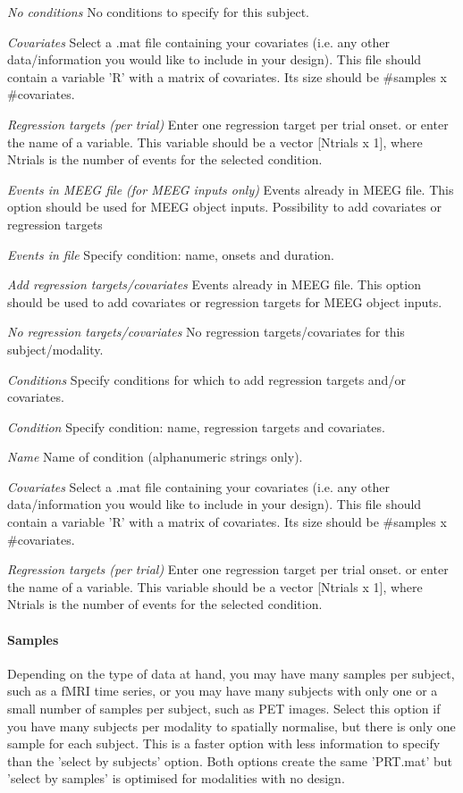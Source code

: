 \textit{No conditions}
No conditions to specify for this subject.


\textit{Covariates}
Select a .mat file containing your covariates (i.e. any other data/information you would like to include in your design). This file should contain a variable 'R' with a matrix of covariates. Its size should be \#samples x \#covariates.


\textit{Regression targets (per trial)}
Enter one regression target per trial onset. or enter the name of a variable.  This variable should be a vector [Ntrials x 1], where Ntrials is the number of events for the selected condition.


\textsl{Events in MEEG file (for MEEG inputs only)}
Events already in MEEG file. This option should be used for MEEG object inputs. Possibility to add covariates or regression targets


\textit{Events in file}
Specify condition: name, onsets and duration.


\textit{Add regression targets/covariates}
Events already in MEEG file. This option should be used to add covariates or regression targets for MEEG object inputs.


\textit{No regression targets/covariates}
No regression targets/covariates for this subject/modality.


\textit{Conditions}
Specify conditions for which to add regression targets and/or covariates.


\textit{Condition}
Specify condition: name, regression targets and covariates.


\textit{Name}
Name of condition (alphanumeric strings only).


\textit{Covariates}
Select a .mat file containing your covariates (i.e. any other data/information you would like to include in your design). This file should contain a variable 'R' with a matrix of covariates. Its size should be \#samples x \#covariates.


\textit{Regression targets (per trial)}
Enter one regression target per trial onset. or enter the name of a variable.  This variable should be a vector [Ntrials x 1], where Ntrials is the number of events for the selected condition.


\paragraph{Samples}
Depending on the type of data at hand, you may have many samples per subject, such as a fMRI time series, or you may have many subjects with only one or a small number of samples per subject, such as PET images. Select this option if you have many subjects per modality to spatially normalise, but there is only one sample for each subject. This is a faster option with less information to specify than the 'select by subjects' option. Both options create the same 'PRT.mat' but 'select by samples' is optimised for modalities with no design.


